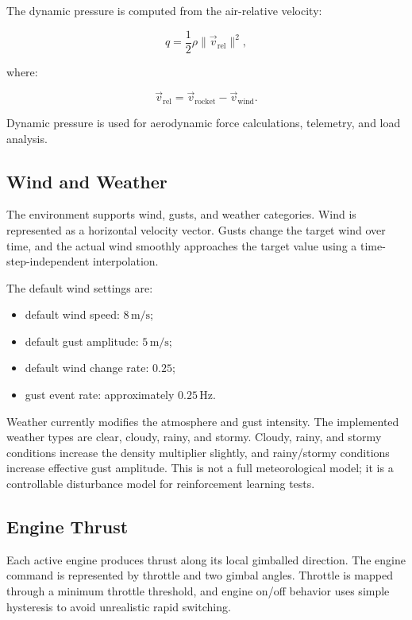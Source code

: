 \documentclass[12pt,a4paper]{article}
\begin{document}
The dynamic pressure is computed from the air-relative velocity:

\begin{equation}
q = \frac{1}{2}\rho \|\vec{v}_{\mathrm{rel}}\|^2,
\end{equation}

where:

\begin{equation}
\vec{v}_{\mathrm{rel}} = \vec{v}_{\mathrm{rocket}} - \vec{v}_{\mathrm{wind}}.
\end{equation}

Dynamic pressure is used for aerodynamic force calculations, telemetry, and load analysis.

\subsection{Wind and Weather}

The environment supports wind, gusts, and weather categories. Wind is represented as a horizontal velocity vector. Gusts change the target wind over time, and the actual wind smoothly approaches the target value using a time-step-independent interpolation.

The default wind settings are:

\begin{itemize}
    \item default wind speed: \(8\,\mathrm{m/s}\);
    \item default gust amplitude: \(5\,\mathrm{m/s}\);
    \item default wind change rate: \(0.25\);
    \item gust event rate: approximately \(0.25\,\mathrm{Hz}\).
\end{itemize}

Weather currently modifies the atmosphere and gust intensity. The implemented weather types are clear, cloudy, rainy, and stormy. Cloudy, rainy, and stormy conditions increase the density multiplier slightly, and rainy/stormy conditions increase effective gust amplitude. This is not a full meteorological model; it is a controllable disturbance model for reinforcement learning tests.

\subsection{Engine Thrust}

Each active engine produces thrust along its local gimballed direction. The engine command is represented by throttle and two gimbal angles. Throttle is mapped through a minimum throttle threshold, and engine on/off behavior uses simple hysteresis to avoid unrealistic rapid switching.
\end{document}
